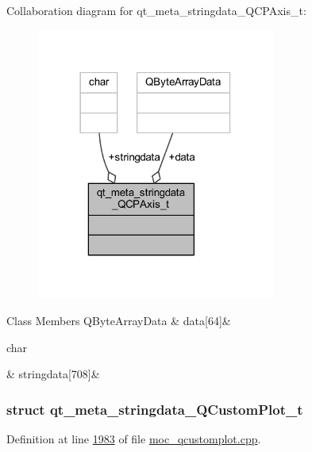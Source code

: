 Collaboration diagram for qt\+\_\+meta\+\_\+stringdata\+\_\+\+Q\+C\+P\+Axis\+\_\+t\+:
\nopagebreak
\begin{figure}[H]
\begin{center}
\leavevmode
\includegraphics[width=222pt]{d8/d00/a00186}
\end{center}
\end{figure}
\begin{DoxyFields}{Class Members}
\hypertarget{a00016_a6de5289a2e23a98b0352a48533dedbd4}{Q\+Byte\+Array\+Data}\label{a00016_a6de5289a2e23a98b0352a48533dedbd4}
&
data\mbox{[}64\mbox{]}&
\\
\hline

\hypertarget{a00016_a1fe440f64883a266431cf43cff1b5052}{char}\label{a00016_a1fe440f64883a266431cf43cff1b5052}
&
stringdata\mbox{[}708\mbox{]}&
\\
\hline

\end{DoxyFields}
\label{d8/d87/a00118}
\hypertarget{a00016_d8/d87/a00118}{}
\subsubsection{struct qt\+\_\+meta\+\_\+stringdata\+\_\+\+Q\+Custom\+Plot\+\_\+t}


Definition at line \hyperlink{a00016_source_l01983}{1983} of file \hyperlink{a00016_source}{moc\+\_\+qcustomplot.\+cpp}.



